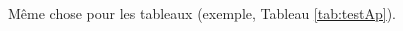 \documentclass[letterpaper
, twoside
, 12pt
,these
,francais
,creativecommons,hyperref
]{thETS}
\begin{document}
Même chose pour les tableaux (exemple, Tableau \ref{tab:testAp}).



\newpage
\begin{spacing}{1}
	\nocite{*} %


\end{spacing}


\newpage
\begin{spacing}{1}


\end{spacing}
\end{document}
